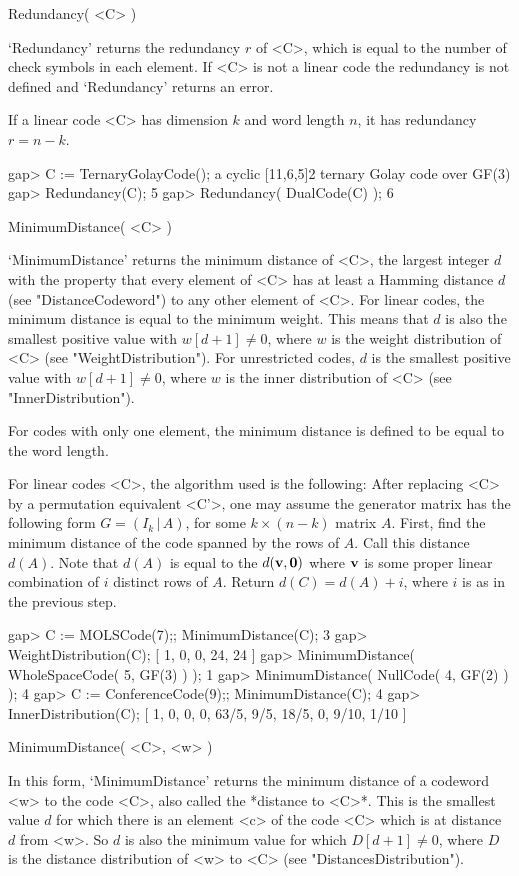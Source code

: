 \>Redundancy( <C> )

`Redundancy' returns the redundancy  $r$ of <C>, which   is equal to  the
number of check symbols in each element. If <C> is not  a linear code the
redundancy is not defined and `Redundancy' returns an error.

If   a linear code   <C> has dimension $k$  and  word length  $n$, it has
redundancy $r=n-k$.

\beginexample
gap> C := TernaryGolayCode();
a cyclic [11,6,5]2 ternary Golay code over GF(3)
gap> Redundancy(C);
5
gap> Redundancy( DualCode(C) );
6 
\endexample

\>MinimumDistance( <C> )

`MinimumDistance'  returns  the  minimum distance   of  <C>, the  largest
integer $d$ with the  property that every element of  <C> has at least  a
Hamming  distance  $d$ (see "DistanceCodeword")  to  any other element of
<C>.  For linear  codes, the  minimum distance is   equal to  the minimum
weight. This  means that  $d$ is also  the  smallest positive value  with
$w[d+1]  \neq 0$,   where $w$ is   the  weight distribution  of  <C> (see
"WeightDistribution").  For unrestricted    codes,  $d$ is  the  smallest
positive value with $w[d+1] \neq 0$, where $w$  is the inner distribution
of <C> (see "InnerDistribution").

For  codes with only  one element, the  minimum distance is defined to be
equal to the word length.

For linear codes <C>, the algorithm used is the following:
After replacing <C> by a permutation equivalent <C'>, 
one may assume the generator matrix has the following form
$G=(I_{k} \, | \, A)$, for some $k\times (n-k)$ matrix $A$.
First, find the minimum distance of the code spanned by the 
rows of $A$. Call this
distance $d(A)$. Note that $d(A)$ is equal to the 
$d({\bf v},{\bf 0})$ where ${\bf v}$ 
is some proper linear combination of $i$ distinct rows of $A$.
Return $d(C)=d(A)+i$, where $i$ is as in the previous step.

\beginexample
gap> C := MOLSCode(7);; MinimumDistance(C);
3
gap> WeightDistribution(C);
[ 1, 0, 0, 24, 24 ]
gap> MinimumDistance( WholeSpaceCode( 5, GF(3) ) );
1
gap> MinimumDistance( NullCode( 4, GF(2) ) );
4
gap> C := ConferenceCode(9);; MinimumDistance(C);
4
gap> InnerDistribution(C);
[ 1, 0, 0, 0, 63/5, 9/5, 18/5, 0, 9/10, 1/10 ] 
\endexample

\>MinimumDistance( <C>, <w> )

In  this  form, `MinimumDistance'  returns   the  minimum  distance of  a
codeword <w> to the code <C>, also called the *distance  to <C>*. This is
the smallest value $d$ for which there is an element <c>  of the code <C>
which is at distance $d$ from <w>.  So $d$ is also  the minimum value for
which $D[d+1] \neq  0$, where $D$ is  the distance distribution of <w> to
<C> (see "DistancesDistribution").

